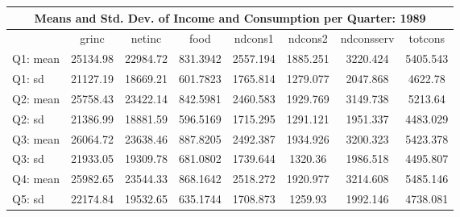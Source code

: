 \begin{tabular}{l*{7}{c}}
\hline\hline
\multicolumn{8}{c}{Means and Std. Dev. of Income and Consumption per Quarter: 1989}  \\
\hline    
            &       grinc&      netinc&        food&     ndcons1&     ndcons2&  ndconsserv&     totcons\\
\hline
Q1: mean        &    25134.98&    22984.72&    831.3942&    2557.194&    1885.251&    3220.424&    5405.543\\
Q1: sd    &    21127.19&    18669.21&    601.7823&    1765.814&    1279.077&    2047.868&     4622.78\\
Q2: mean       &    25758.43&    23422.14&    842.5981&    2460.583&    1929.769&    3149.738&     5213.64\\
Q2: sd       &    21386.99&    18881.59&    596.5169&    1715.295&    1291.121&    1951.337&    4483.029\\
Q3: mean       &    26064.72&    23638.46&    887.8205&    2492.387&    1934.926&    3200.323&    5423.378\\
Q3: sd        &    21933.05&    19309.78&    681.0802&    1739.644&     1320.36&    1986.518&    4495.807\\
Q4: mean          &    25982.65&    23544.33&    868.1642&    2518.272&    1920.977&    3214.608&    5485.146\\
Q5: sd       &    22174.84&    19532.65&    635.1744&    1708.873&     1259.93&    1992.146&    4738.081\\
\hline\hline
\end{tabular}
